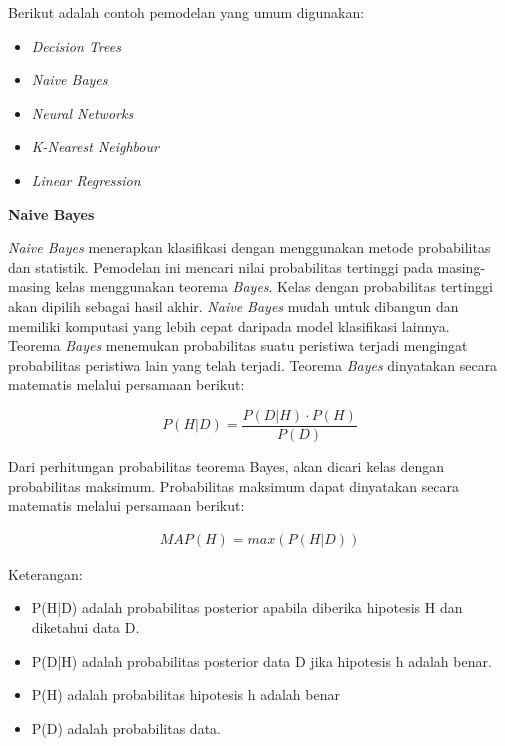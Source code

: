 \documentclass[a4paper,twoside]{article}
\begin{document}
\begin{enumerate}
\noindent Berikut adalah contoh pemodelan yang umum digunakan:
\begin{itemize}
\item \textit{Decision Trees}
\item \textit{Naive Bayes}
\item \textit{Neural Networks}
\item \textit{K-Nearest Neighbour}
\item \textit{Linear Regression}
\end{itemize}



\textbf{Naive Bayes}
\par \textit{Naive Bayes} menerapkan klasifikasi dengan menggunakan metode probabilitas dan statistik. Pemodelan ini mencari nilai probabilitas tertinggi pada masing-masing kelas menggunakan teorema \textit{Bayes}. Kelas dengan probabilitas tertinggi akan dipilih sebagai hasil akhir. \textit{Naive Bayes} mudah untuk dibangun dan memiliki komputasi yang lebih cepat daripada model klasifikasi lainnya.\\

\noindent Teorema \textit{Bayes} menemukan probabilitas suatu peristiwa terjadi mengingat probabilitas peristiwa lain yang telah terjadi. Teorema \textit{Bayes} dinyatakan secara matematis melalui persamaan berikut:

\begin{equation}
P(H|D) = \frac{P(D|H) \cdot P(H)}{P(D)}
\end{equation}

\noindent
Dari perhitungan probabilitas teorema Bayes, akan dicari kelas dengan probabilitas maksimum. Probabilitas maksimum dapat dinyatakan secara matematis melalui persamaan berikut:

\begin{align}
MAP(H) = max(P(H|D))
\end{align}

\noindent Keterangan:
\begin{itemize}
\item P(H|D) adalah probabilitas posterior apabila diberika hipotesis H dan diketahui data D. 
\item P(D|H) adalah probabilitas posterior data D jika hipotesis h adalah benar.
\item P(H) adalah probabilitas hipotesis h adalah benar 
\item P(D) adalah probabilitas data.
\end{itemize}


\end{enumerate}
\end{document}
